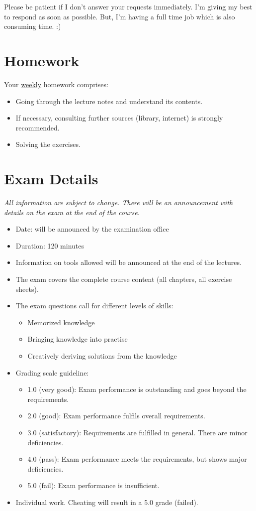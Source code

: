 Please be patient if I don't answer your requests immediately. I'm giving my best to respond as soon as possible. But, I'm having a full time job which is also consuming time. :)


\section{Homework}

Your \underline{weekly} homework comprises:
\begin{itemize}
	\item Going through the lecture notes and understand its contents.
	\item If necessary, consulting further sources (library, internet) is strongly recommended.
	\item Solving the exercises.
\end{itemize}


\section{Exam Details}

\textit{All information are subject to change. There will be an announcement with details on the exam at the end of the course.}

\begin{itemize}
	\item Date: will be announced by the examination office
	\item Duration: 120 minutes
	\item Information on tools allowed will be announced at the end of the lectures.
	\item The exam covers the complete course content (all chapters, all exercise sheets).
	\item The exam questions call for different levels of skills:
	\begin{itemize}
		\item Memorized knowledge
		\item Bringing knowledge into practise
		\item Creatively deriving solutions from the knowledge
	\end{itemize}
	\item Grading scale guideline:
	\begin{itemize}
		\item 1.0 (very good): Exam performance is outstanding and goes beyond the requirements.
		\item 2.0 (good): Exam performance fulfils overall requirements.
		\item 3.0 (satisfactory): Requirements are fulfilled in general. There are minor deficiencies.
		\item 4.0 (pass): Exam performance meets the requirements, but shows major deficiencies.
		\item 5.0 (fail): Exam performance is insufficient.
	\end{itemize}
	\item Individual work. Cheating will result in a 5.0 grade (failed).
\end{itemize}


